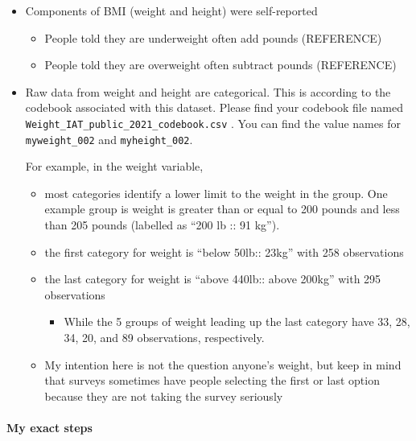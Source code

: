 \documentclass[
  letterpaper,
  DIV=11,
  numbers=noendperiod]{scrartcl}
\let\oldparagraph\paragraph
\renewcommand{\paragraph}[1]{\oldparagraph{#1}\mbox{}}
\providecommand{\tightlist}{%
  \setlength{\itemsep}{0pt}\setlength{\parskip}{0pt}}\usepackage{longtable,booktabs,array}
\begin{document}
\begin{itemize}
\item
  Components of BMI (weight and height) were self-reported

  \begin{itemize}
  \item
    People told they are underweight often add pounds (REFERENCE)
  \item
    People told they are overweight often subtract pounds (REFERENCE)
  \end{itemize}
\item
  Raw data from weight and height are categorical. This is according to
  the codebook associated with this dataset. Please find your codebook
  file named \texttt{Weight\_IAT\_public\_2021\_codebook.csv} . You can
  find the value names for \texttt{myweight\_002} and
  \texttt{myheight\_002}.

  For example, in the weight variable,

  \begin{itemize}
  \item
    most categories identify a lower limit to the weight in the group.
    One example group is weight is greater than or equal to 200 pounds
    and less than 205 pounds (labelled as ``200 lb :: 91 kg'').
  \item
    the first category for weight is ``below 50lb:: 23kg'' with 258
    observations
  \item
    the last category for weight is ``above 440lb:: above 200kg'' with
    295 observations

    \begin{itemize}
    \tightlist
    \item
      While the 5 groups of weight leading up the last category have 33,
      28, 34, 20, and 89 observations, respectively.
    \end{itemize}
  \item
    My intention here is not the question anyone's weight, but keep in
    mind that surveys sometimes have people selecting the first or last
    option because they are not taking the survey seriously
  \end{itemize}
\end{itemize}

\hypertarget{my-exact-steps}{%
\paragraph{My exact steps}\label{my-exact-steps}}
\end{document}
